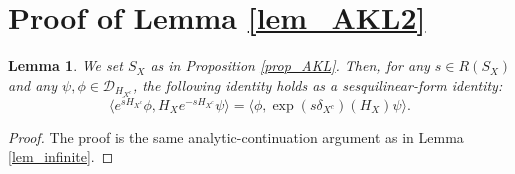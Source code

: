 \documentclass[11pt]{article}
\numberwithin{equation}{section}
\newtheorem{lemma}[theorem]{Lemma}
\begin{document}
\newpage
\section{Proof of Lemma \ref{lem_AKL2}}\label{S_AKL2}
\begin{lemma}\label{lem_infinite2}
We set $S_X$ as in Proposition \ref{prop_AKL}. Then, for any $s\in R(S_X)$ and any $\psi,\phi\in\mathcal{D}_{H_{X^c}}$, the following identity holds as a sesquilinear-form identity:
\[
\langle e^{\bar{s}H_{X^c}}\phi,H_X e^{-sH_{X^c}}\psi\rangle=\langle\phi,\exp(s\delta_{X^c})(H_X)\psi\rangle.
\]
\end{lemma}
\begin{proof}
The proof is the same analytic-continuation argument as in Lemma \ref{lem_infinite}.
\end{proof}
\end{document}
